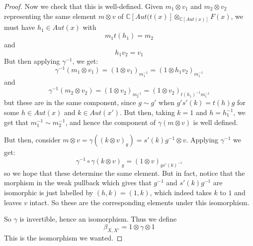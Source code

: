 \documentclass[10pt]{amsart}
\numberwithin{theorem}{subsection}
\begin{document}
\begin{proof}
Now we check that this is well-defined.  Given $m_1 \otimes v_1$ and
$m_2 \otimes v_2$ representing the same element $m \otimes v$ of
$\mathbb{C}[Aut(t(x)] \otimes_{\mathbb{C}[Aut({x})]} F(x)$, we must have $h_1
\in Aut(x)$ with
\begin{equation}
m_1 t(h_1) = m_2
\end{equation}
and
\begin{equation}
h_1 v_2 = v_1
\end{equation}
But then applying $\gamma^{-1}$, we get:
\begin{equation}
\gamma^{-1}(m_1 \otimes v_1) = (1 \otimes v_1)_{m_1^{-1}} = (1 \otimes h_1 v_2)_{m_1^{-1}}
\end{equation}
and
\begin{equation}
\gamma^{-1}(m_2 \otimes v_2) = (1 \otimes v_2)_{m_2^{-1}} = (1 \otimes v_2)_{t(h_1)^{-1} m_1^{-1}}
\end{equation}
but these are in the same component, since $g \sim g'$ when $g'
s'(k) = t(h) g$ for some $h \in Aut(x)$ and $k \in Aut({x'})$.  But
then, taking $k=1$ and $h = h_1^{-1}$, we get that $m_1^{-1} \sim
m_2^{-1}$, and hence the component of $\gamma(m \otimes v)$ is well
defined.

But then, consider $m \otimes v = \gamma((k \otimes v)_g) = s'(k)
g^{-1} \otimes v$.  Applying $\gamma^{-1}$ we get:
\begin{equation}
\gamma^{-1} \circ \gamma (k \otimes v)_g = (1 \otimes v)_{g s'(k)^{-1}}
\end{equation}
so we hope that these determine the same element.  But in fact, notice
that the morphism in the weak pullback which gives that $g^{-1}$ and
$s'(k) g^{-1}$ are isomorphic is just labelled by $(h,k) = (1,k)$,
which indeed takes $k$ to $1$ and leaves $v$ intact.  So these are the
corresponding elements under this isomorphism.

So $\gamma$ is invertible, hence an isomorphism.  Thus we define
\begin{equation}
\beta_{X,X'} = 1 \otimes \gamma \otimes 1
\end{equation}
This is the isomorphism we wanted.
\end{proof}
\end{document}

